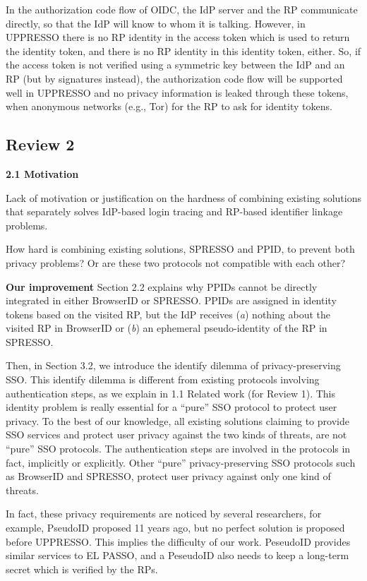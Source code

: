 \documentclass[letterpaper,onecolumn,10pt]{article}
\begin{document}
In the authorization code flow of OIDC, the IdP server and the RP communicate directly, so that the IdP will know to whom it is talking.
However,
        in UPPRESSO there is no RP identity in the access token which is used to return the identity token,
            and there is no RP identity in this identity token, either.
So, if the access token is not verified using a symmetric key between the IdP and an RP (but by signatures instead),
    the authorization code flow will be supported well in UPPRESSO and no privacy information is leaked through these tokens,
        when anonymous networks (e.g., Tor) for the RP to ask for identity tokens.

\subsection*{Review 2}
\noindent\textbf{2.1 Motivation}

Lack of motivation or justification on the hardness of combining existing solutions that separately solves IdP-based login tracing and RP-based identifier linkage problems.

How hard is combining existing solutions, SPRESSO and PPID, to prevent both privacy problems? Or are these two protocols not compatible with each other?

\vspace{1mm}\noindent\textbf{Our improvement}
Section 2.2 explains why PPIDs cannot be directly integrated in either BrowserID or SPRESSO.
PPIDs are assigned in identity tokens based on the visited RP, but the IdP receives (\emph{a}) nothing about the
visited RP in BrowserID or (\emph{b}) an ephemeral pseudo-identity of the RP in SPRESSO.

Then, in Section 3.2, we introduce the identify dilemma of privacy-preserving SSO.
This identify dilemma is different from existing protocols involving authentication steps,
    as we explain in 1.1 Related work (for Review 1).
This identity problem is really essential for a ``pure'' SSO protocol to protect user privacy.
To the best of our knowledge, all existing solutions claiming to provide SSO services and protect user privacy against the two kinds of threats,
    are not ``pure'' SSO protocols. The authentication steps are involved in the protocols in fact, implicitly or explicitly.
Other ``pure'' privacy-preserving SSO protocols such as BrowserID and SPRESSO,
    protect user privacy against only one kind of threats.

In fact, these privacy requirements are noticed by several researchers,
    for example, PseudoID proposed 11 years ago,
    but no perfect solution is proposed before UPPRESSO.
This implies the difficulty of our work.
PeseudoID provides similar services to EL PASSO,
    and a PeseudoID also needs to keep a long-term secret which is verified by the RPs.
\end{document}
